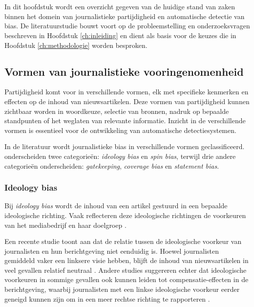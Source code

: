 \chapter{}
\label{ch:stand-van-zaken}

In dit hoofdstuk wordt een overzicht gegeven van de huidige stand van zaken binnen het domein van journalistieke partijdigheid en automatische detectie van bias. De literatuurstudie bouwt voort op de probleemstelling en onderzoeksvragen beschreven in Hoofdstuk \ref{ch:inleiding} en dient als basis voor de keuzes die in Hoofdstuk \ref{ch:methodologie} worden besproken.

\section{Vormen van journalistieke vooringenomenheid}
\label{sec:vormen-van-journalistieke-vooringenomenheid}

Partijdigheid komt voor in verschillende vormen, elk met specifieke kenmerken en effecten op de inhoud van nieuwsartikelen. Deze vormen van partijdigheid kunnen zichtbaar worden in woordkeuze, selectie van bronnen, nadruk op bepaalde standpunten of het weglaten van relevante informatie. Inzicht in de verschillende vormen is essentieel voor de ontwikkeling van automatische detectiesystemen.

In de literatuur wordt journalistieke bias in verschillende vormen geclassificeerd. \textcite{Mullainathan2002} onderscheiden twee categorieën: \textit{ideology bias} en \textit{spin bias}, terwijl \textcite{SaezTrumper2013} drie andere categorieën onderscheiden: \textit{gatekeeping}, \textit{coverage bias} en \textit{statement bias}.

\subsection{Ideology bias}

Bij \textit{ideology bias} wordt de inhoud van een artikel gestuurd in een bepaalde ideologische richting. Vaak reflecteren deze ideologische richtingen de voorkeuren van het mediabedrijf en haar doelgroep \autocite{Mullainathan2002}.

Een recente studie toont aan dat de relatie tussen de ideologische voorkeur van journalisten en hun berichtgeving niet eenduidig is. Hoewel journalisten gemiddeld vaker een linksere visie hebben, blijft de inhoud van nieuwsartikelen in veel gevallen relatief neutraal \autocite{Coddington2026}. Andere studies suggereren echter dat ideologische voorkeuren in sommige gevallen ook kunnen leiden tot com\-pensatie-effecten in de berichtgeving, waarbij journalisten met een linkse ideologische voorkeur eerder geneigd kunnen zijn om in een meer rechtse richting te rapporteren \autocite{Beckers2019}.

